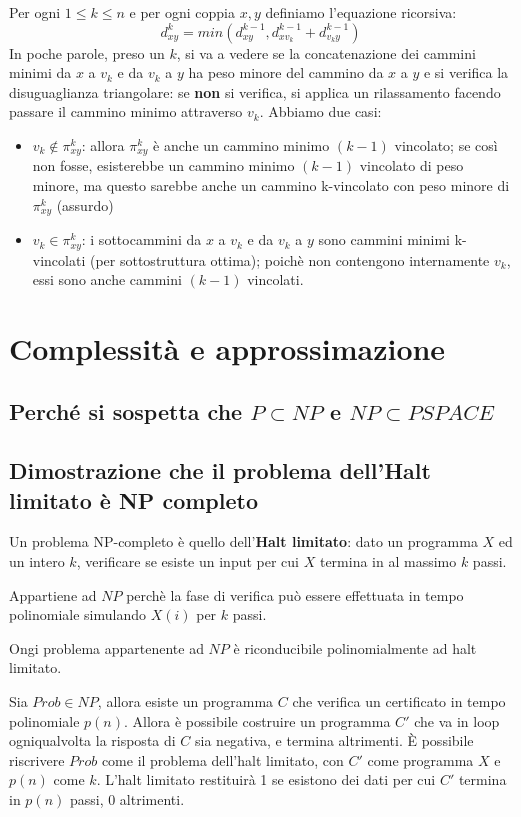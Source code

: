 \documentclass[11pt]{article}
\begin{document}
Per ogni $1\leq k\leq n$ e per ogni coppia $x,y$ definiamo l'equazione ricorsiva: 
\begin{equation*}
    d^k_{xy}=min(d^{k-1}_{xy}, d^{k-1}_{xv_k}+d^{k-1}_{v_ky})
\end{equation*}
In poche parole, preso un $k$, si va a vedere se la concatenazione dei cammini minimi da $x$ a $v_k$ e da $v_k$ a $y$ ha 
peso minore del cammino da $x$ a $y$ e si verifica la disuguaglianza triangolare: se \textbf{non} si verifica, si applica 
un rilassamento facendo passare il cammino minimo attraverso $v_k$.
Abbiamo due casi:
\begin{itemize}
    \item $v_k\notin\pi^k_{xy}$: allora $\pi^k_{xy}$ è anche un cammino minimo $(k-1)$ vincolato; se così non fosse, esisterebbe un 
    cammino minimo $(k-1)$ vincolato di peso minore, ma questo sarebbe anche un cammino k-vincolato con peso minore di $\pi^k_{xy}$
    (assurdo)
    \item $v_k\in\pi^k_{xy}$: i sottocammini da $x$ a $v_k$ e da $v_k$ a $y$ sono cammini minimi k-vincolati (per sottostruttura 
    ottima); poichè non contengono internamente $v_k$, essi sono anche cammini $(k-1)$ vincolati.
\end{itemize}
\section*{Complessità e approssimazione}
\subsection*{Perché si sospetta che $P\subset NP$ e $NP\subset PSPACE$}

\subsection*{Dimostrazione che il problema dell'Halt limitato è NP completo}
Un problema NP-completo è quello dell'\textbf{Halt limitato}: dato un programma $X$ ed un intero $k$, verificare se esiste 
un input per cui $X$ termina in al massimo $k$ passi.

Appartiene ad $NP$ perchè la fase di verifica può essere effettuata in tempo polinomiale simulando $X(i)$ per $k$ passi.

Ongi problema appartenente ad $NP$ è riconducibile polinomialmente ad halt limitato. 

Sia $Prob\in NP$, allora esiste un programma $C$ che verifica un certificato in tempo polinomiale $p(n)$. Allora è possibile 
costruire un programma $C'$ che va in loop ogniqualvolta la risposta di $C$ sia negativa, e termina altrimenti.
È possibile riscrivere $Prob$ come il problema dell'halt limitato, con $C'$ come programma $X$ e $p(n)$ come $k$.
L'halt limitato restituirà 1 se esistono dei dati per cui $C'$ termina in $p(n)$ passi, 0 altrimenti.
\end{document}
